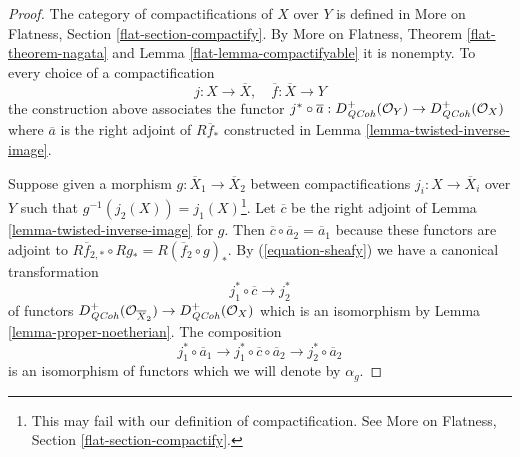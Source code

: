 \begin{proof}
The category of compactifications of $X$ over $Y$ is defined
in More on Flatness, Section \ref{flat-section-compactify}.
By More on Flatness, Theorem \ref{flat-theorem-nagata} and
Lemma \ref{flat-lemma-compactifyable} it is nonempty.
To every choice of a compactification
$$
j : X \to \overline{X},\quad \overline{f} : \overline{X} \to Y
$$
the construction above associates the functor $j^* \circ \overline{a} :
D_{\mathit{QCoh}}^+(\mathcal{O}_Y) \to D_{\mathit{QCoh}}^+(\mathcal{O}_X)$
where $\overline{a}$ is the right adjoint of $R\overline{f}_*$
constructed in Lemma \ref{lemma-twisted-inverse-image}.

\medskip\noindent
Suppose given a morphism $g : \overline{X}_1 \to \overline{X}_2$
between compactifications $j_i : X \to \overline{X}_i$ over $Y$
such that $g^{-1}(j_2(X)) = j_1(X)$\footnote{This may fail
with our definition of compactification. See
More on Flatness, Section \ref{flat-section-compactify}.}.
Let $\overline{c}$ be the right adjoint of
Lemma \ref{lemma-twisted-inverse-image} for $g$.
Then $\overline{c} \circ \overline{a}_2 = \overline{a}_1$
because these functors are adjoint to
$R\overline{f}_{2, *} \circ Rg_* = R(\overline{f}_2 \circ g)_*$.
By (\ref{equation-sheafy}) we have a canonical transformation
$$
j_1^* \circ \overline{c} \longrightarrow j_2^*
$$
of functors
$D^+_{\mathit{QCoh}}(\mathcal{O}_{\overline{X}_2}) \to D^+_{\mathit{QCoh}}(\mathcal{O}_X)$
which is an isomorphism by Lemma \ref{lemma-proper-noetherian}.
The composition
$$
j_1^* \circ \overline{a}_1 \longrightarrow
j_1^* \circ \overline{c} \circ \overline{a}_2 \longrightarrow
j_2^* \circ \overline{a}_2
$$
is an isomorphism of functors which we will denote by $\alpha_g$.


\end{proof}
